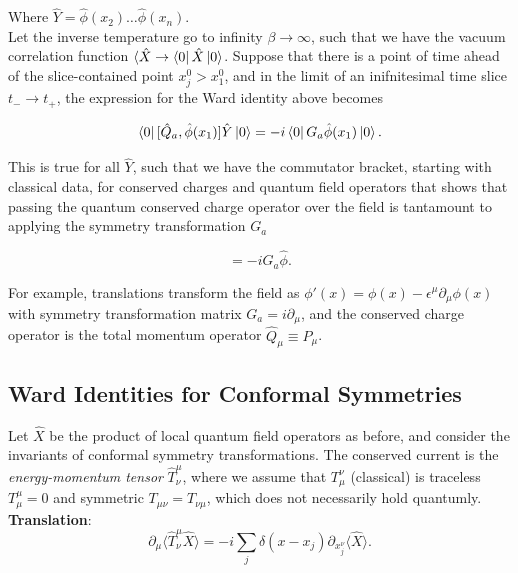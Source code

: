 \noindent Where $\hat{Y} = \hat{\phi} (x_2) \dots \hat{\phi} (x_n)$. \\

\noindent Let the inverse temperature go to infinity $\beta \rightarrow \infty$, such that we have the vacuum correlation function $\langle \hat{X} \rightarrow \bra{0} \hat{X} \ket{0}$. Suppose that there is a point of time ahead of the slice-contained point $x_j^0 > x_1^0$, and in the limit of an inifnitesimal time slice$t_- \rightarrow t_+$, the expression for the Ward identity above becomes

\begin{equation}
\bra{0} [ \hat{Q}_a, \hat{\phi} (x_1) ] \hat{Y} \ket{0} = -i \bra{0} G_a \hat{\phi} (x_1) \ket{0}.
\end{equation}

\noindent This is true for all $\hat{Y}$, such that we have the commutator bracket, starting with classical data, for conserved charges and quantum field operators that shows that passing the quantum conserved charge operator over the field is tantamount to applying the symmetry transformation $G_a$

\begin{equation}
[ \hat{Q}_a, \hat{\phi} ] = -i G_a \hat{\phi}.
\end{equation}

\noindent For example, translations transform the field as $\phi' (x) = \phi (x) - \epsilon^\mu \partial_\mu \phi (x)$ with symmetry transformation matrix $G_a = i \partial_\mu$, and the conserved charge operator is the total momentum operator $\hat{Q}_\mu \equiv \hat{P}_\mu$. \\

\subsection*{Ward Identities for Conformal Symmetries}

\noindent Let $\hat{X}$ be the product of local quantum field operators as before, and consider the invariants of conformal symmetry transformations. The conserved current is the \textit{energy-momentum tensor} $\hat{T}^\mu_\nu$, where we assume that $T_\mu^\nu$ (classical) is traceless $T^\mu_\mu = 0$ and symmetric $T_{\mu\nu} = T_{\nu\mu}$, which does not necessarily hold quantumly. \\

\noindent \textbf{Translation}: \\

\begin{equation}
\partial_\mu \langle \hat{T}^\mu_\nu \hat{X} \rangle = -i \sum_j \delta(x-x_j) \partial_{x_j^\nu} \langle \hat{X} \rangle.
\end{equation}

